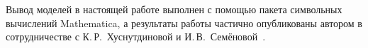 \documentclass[12pt, a4paper]{report}
\begin{document}
Вывод моделей в настоящей работе выполнен с помощью пакета символьных вычислений Mathematica, а результаты работы частично опубликованы автором в сотрудничестве с К.\,Р.~Хуснутдиновой и И.\,В.~Семёновой~\cite{Garbuzov}.

\end{document}
